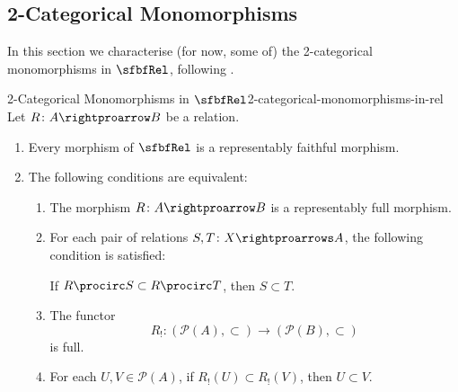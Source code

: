 \subsection{2-Categorical Monomorphisms}\label{subsection-2-categorical-monomorphisms-in-rel}
In this section we characterise (for now, some of) the 2-categorical monomorphisms in $\sfbfRel$, following .
\begin{proposition}{2-Categorical Monomorphisms in $\sfbfRel$}{2-categorical-monomorphisms-in-rel}%
    Let $R\colon A\rightproarrow B$ be a relation.
    \begin{enumerate}
        \item\label{2-categorical-monomorphisms-in-rel-representably-faithful-morphisms-in-rel}Every morphism of $\sfbfRel$ is a representably faithful morphism.
        \item\label{2-categorical-monomorphisms-in-rel-representably-full-morphisms-in-rel}The following conditions are equivalent:
            \begin{enumerate}
                \item\label{2-categorical-monomorphisms-in-rel-representably-full-morphisms-in-rel-1}The morphism $R\colon A\rightproarrow B$ is a representably full morphism.
                \item\label{2-categorical-monomorphisms-in-rel-representably-full-morphisms-in-rel-2}For each pair of relations $S,T\colon X\rightproarrows A$, the following condition is satisfied:
                    \begin{itemize}
                        \itemstar If $R\procirc S\subset R\procirc T$, then $S\subset T$.
                    \end{itemize}
                \item\label{2-categorical-monomorphisms-in-rel-representably-full-morphisms-in-rel-3}The functor
                    \[
                        R_{!}%
                        \colon%
                        (\mathcal{P}(A),\subset)%
                        \to%
                        (\mathcal{P}(B),\subset)%
                    \]%
                    is full.
                \item\label{2-categorical-monomorphisms-in-rel-representably-full-morphisms-in-rel-4}For each $U,V\in\mathcal{P}(A)$, if $R_{!}(U)\subset R_{!}(V)$, then $U\subset V$.

\end{enumerate}
\end{enumerate}
\end{proposition}
